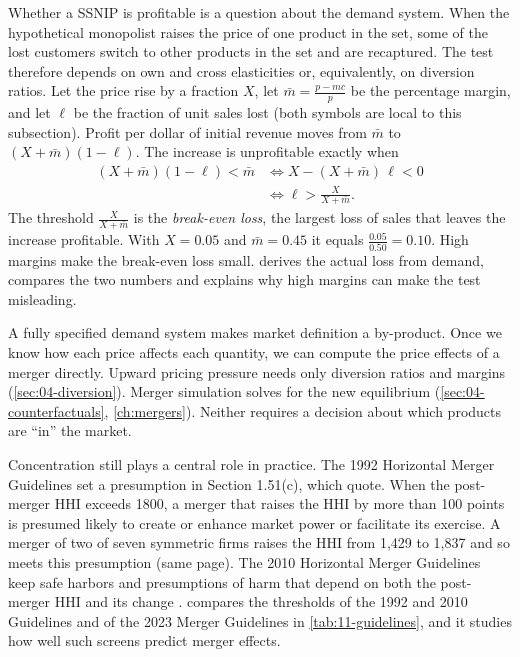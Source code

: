 Whether a SSNIP is profitable is a question about the demand system. When the hypothetical monopolist raises the
price of one product in the set, some of the lost customers switch to other products in the set and are
recaptured. The test therefore depends on own and cross elasticities or, equivalently, on diversion ratios. Let
the price rise by a fraction $X$, let $\bar m = \frac{p - mc}{p}$ be the percentage margin, and let $\ell$ be the
fraction of unit sales lost (both symbols are local to this subsection). Profit per dollar of initial revenue
moves from $\bar m$ to $(X + \bar m)(1 - \ell)$. The increase is unprofitable exactly when
\begin{align*}
(X + \bar m)(1 - \ell) < \bar m
&\iff X - (X + \bar m)\,\ell < 0 \\
&\iff \ell > \frac{X}{X + \bar m}.
\end{align*}
The threshold $\frac{X}{X + \bar m}$ is the \emph{break-even loss}, the largest loss of sales that leaves the
increase profitable. With $X = 0.05$ and $\bar m = 0.45$ it equals $\frac{0.05}{0.50} = 0.10$. High margins make
the break-even loss small.  derives the actual loss from demand, compares the two numbers
and explains why high margins can make the test misleading.

A fully specified demand system makes market definition a by-product. Once we know how each price affects each
quantity, we can compute the price effects of a merger directly. Upward pricing pressure needs only diversion
ratios and margins (\cref{sec:04-diversion}). Merger simulation solves for the new equilibrium
(\cref{sec:04-counterfactuals}, \cref{ch:mergers}). Neither requires a decision about which products are ``in''
the market.

Concentration still plays a central role in practice. The 1992 Horizontal Merger Guidelines \citep{USDOJFTC1992}
set a presumption in Section 1.51(c), which \citet[p.~26]{FarrellShapiro2010} quote. When the post-merger HHI
exceeds 1800, a merger that raises the HHI by more than 100 points is presumed likely to create or enhance market
power or facilitate its exercise. A merger of two of seven symmetric firms raises
the HHI from 1,429 to 1,837 and so meets this presumption (same page). The 2010 Horizontal Merger Guidelines
\citep{USDOJFTC2010} keep safe harbors and presumptions of harm that depend on both the post-merger HHI and its
change \citep[p.~226]{AskerNocke2021}.  compares the thresholds of the 1992 and 2010 Guidelines and
of the 2023 Merger Guidelines \citep{USDOJFTC2023} in \cref{tab:11-guidelines}, and it studies how well such
screens predict merger effects.

